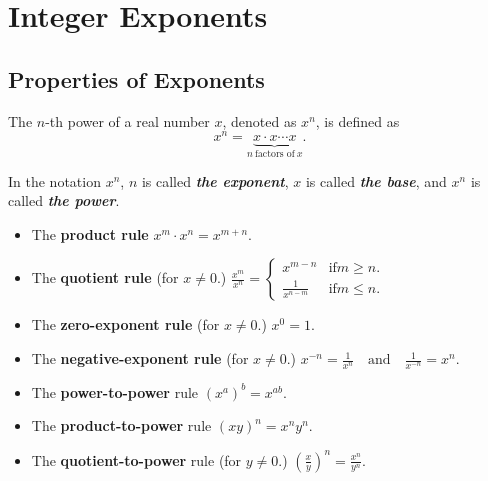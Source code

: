 
\hypertarget{integer-exponents}{%
\section{Integer Exponents}\label{integer-exponents}}

%

\hypertarget{properties-of-exponents}{%
\subsection{Properties of Exponents}\label{properties-of-exponents}}

The $n$-th power of a real number $x$, denoted as $x^n$,  is defined as \[
x^n=\underbrace{x\cdot x \cdots x}_{n~\text{factors of}~x}.
\]

In the notation \(x^n\), \(n\) is called \textbf{\emph{the exponent}},
\(x\) is called \textbf{\emph{the base}}, and \(x^n\) is called
\textbf{\emph{the power}}.%

\begin{itemize}
\item
The \textbf{product rule} \(x^m\cdot x^n=x^{m+n}.\)
\item
The \textbf{quotient rule} (for \(x\neq 0\).)
\(\frac{x^m}{x^n}= \begin{cases} x^{m-n}  & \text{if} m\ge n.\\ \frac{1}{x^{n-m}} & \text{if} m\le n. \end{cases} \)
\item
The \textbf{zero-exponent rule} (for \(x\neq 0\).) \(x^0=1.\)
\item
The \textbf{negative-exponent rule} (for \(x\neq 0\).)
\(x^{-n}=\frac{1}{x^n} \quad\text{and}\quad \frac{1}{x^{-n}}=x^n.\)
\item
The \textbf{power-to-power} rule \(\left(x^a\right)^b=x^{ab}.\)
\item
The \textbf{product-to-power} rule \((xy)^n=x^ny^n.\)
\item
The \textbf{quotient-to-power} rule (for \(y\neq 0\).)
\(\left(\frac{x}{y}\right)^n=\frac{x^n}{y^n}.\)
\end{itemize}


